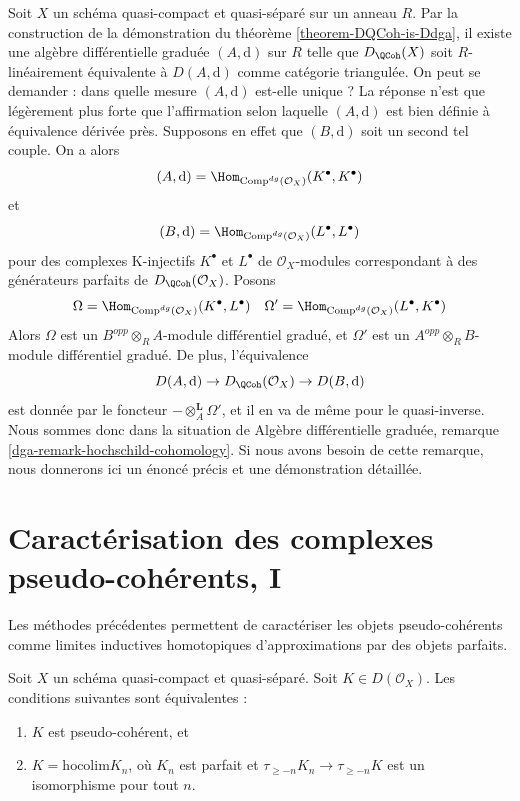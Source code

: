 \begin{remark}
\label{remark-independence-choice}
Soit $X$ un schéma quasi-compact et quasi-séparé sur un anneau $R$.
Par la construction de la démonstration du
théorème \ref{theorem-DQCoh-is-Ddga},
il existe une algèbre différentielle graduée $(A, \text{d})$ sur $R$
telle que $D_\QCoh(X)$ soit $R$-linéairement équivalente à
$D(A, \text{d})$ comme catégorie triangulée.
On peut se demander : dans quelle mesure $(A, \text{d})$ est-elle unique ?
La réponse n'est que légèrement plus forte que l'affirmation selon laquelle
$(A, \text{d})$ est bien définie à équivalence dérivée près.
Supposons en effet que $(B, \text{d})$ soit un second tel couple.
On a alors
$$
(A, \text{d}) = \Hom_{\text{Comp}^{dg}(\mathcal{O}_X)}(K^\bullet, K^\bullet)
$$
et
$$
(B, \text{d}) = \Hom_{\text{Comp}^{dg}(\mathcal{O}_X)}(L^\bullet, L^\bullet)
$$
pour des complexes K-injectifs $K^\bullet$ et $L^\bullet$
de $\mathcal{O}_X$-modules correspondant à des générateurs parfaits
de $D_\QCoh(\mathcal{O}_X)$. Posons
$$
\Omega = \Hom_{\text{Comp}^{dg}(\mathcal{O}_X)}(K^\bullet, L^\bullet)
\quad
\Omega' = \Hom_{\text{Comp}^{dg}(\mathcal{O}_X)}(L^\bullet, K^\bullet)
$$
Alors $\Omega$ est un $B^{opp} \otimes_R A$-module différentiel gradué,
et $\Omega'$ est un $A^{opp} \otimes_R B$-module différentiel gradué.
De plus, l'équivalence
$$
D(A, \text{d}) \to D_\QCoh(\mathcal{O}_X) \to
D(B, \text{d})
$$
est donnée par le foncteur $- \otimes_A^\mathbf{L} \Omega'$, et il en va
de même pour le quasi-inverse. Nous sommes donc dans la situation
de Algèbre différentielle graduée, remarque \ref{dga-remark-hochschild-cohomology}.
Si nous avons besoin de cette remarque, nous donnerons ici un énoncé précis
et une démonstration détaillée.
\end{remark}




\section{Caractérisation des complexes pseudo-cohérents, I}
\label{section-pseudo-coherent-hocolim}

\noindent
Les méthodes précédentes permettent de caractériser les objets pseudo-cohérents
comme limites inductives homotopiques d'approximations par des objets parfaits.

\begin{lemma}
\label{lemma-pseudo-coherent-hocolim}
Soit $X$ un schéma quasi-compact et quasi-séparé.
Soit $K \in D(\mathcal{O}_X)$. Les conditions suivantes sont équivalentes :
\begin{enumerate}
\item $K$ est pseudo-cohérent, et
\item $K = \text{hocolim} K_n$, où
$K_n$ est parfait et $\tau_{\geq -n}K_n \to \tau_{\geq -n}K$
est un isomorphisme pour tout $n$.
\end{enumerate}
\end{lemma}

